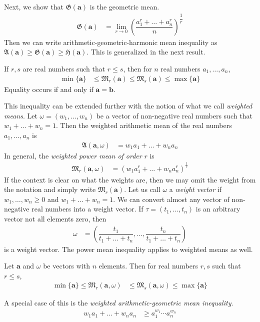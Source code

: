 \documentclass{subfile}
\begin{document}
	Next, we show that $\mathfrak{G}(\mathbf{a})$ is the geometric mean.
		\begin{align*}
			\mathfrak{G}(\mathbf{a})
				& = \lim\limits_{r\to0}\left(\dfrac{a_{1}^{r}+\ldots+a_{n}^{r}}{n}\right)^{\dfrac{1}{r}}
		\end{align*}
	Then we can write arithmetic-geometric-harmonic mean inequality as $\mathfrak{A}(\mathbf{a})\geq\mathfrak{G}(\mathbf{a})\geq \mathfrak{H}(\mathbf{a})$. This is generalized in the next result.
		\begin{theorem}
			If $r,s$ are real numbers such that $r\leq s$, then for $n$ real numbers $a_{1},\ldots,a_{n}$,
				\begin{align*}
					\min\{\mathbf{a}\}
						& \leq \mathfrak{M}_{r}(\mathbf{a})\leq \mathfrak{M}_{s}(\mathbf{a})\leq\max\{\mathbf{a}\}
				\end{align*}
			Equality occurs if and only if $\mathbf{a}=\mathbf{b}$.
		\end{theorem}
	This inequality can be extended further with the notion of what we call \textit{weighted means}. Let $\omega=(w_{1},\ldots,w_{n})$ be a vector of non-negative real numbers such that $w_{1}+\ldots+w_{n}=1$. Then the weighted arithmetic mean of the real numbers $a_{1},\ldots,a_{n}$ is
		\begin{align*}
			\mathfrak{A}(\mathbf{a},\omega)
				& = w_{1}a_{1}+\ldots+w_{n}a_{n}
		\end{align*}
	In general, the \textit{weighted power mean of order} $r$ is
		\begin{align*}
			\mathfrak{M}_{r}(\mathbf{a},\omega)
				& = \left(w_{1}a_{1}^{r}+\ldots+w_{n}a_{n}^{r}\right)^{\frac{1}{r}}
		\end{align*}
	If the context is clear on what the weights are, then we may omit the weight from the notation and simply write $\mathfrak{M}_{r}(\mathbf{a})$. Let us call $\omega$ a \textit{weight vector} if $w_{1},\ldots,w_{n}\geq 0$ and $w_{1}+\ldots+w_{n}=1$. We can convert almost any vector of non-negative real numbers into a weight vector. If $\tau=(t_{1},\ldots,t_{n})$ is an arbitrary vector not all elements zero, then
		\begin{align*}
			\omega
				& = \left(\dfrac{t_{1}}{t_{1}+\ldots+t_{n}},\ldots,\dfrac{t_{n}}{t_{1}+\ldots+t_{n}}\right)
		\end{align*}
	is a weight vector. The power mean inequality applies to weighted means as well.
		\begin{theorem}\label{thm:weightedpowermean}
			Let $\mathbf{a}$ and $\omega$ be vectors with $n$ elements. Then for real numbers $r,s$ such that $r\leq s$,
				\begin{align*}
					\min\{\mathbf{a}\} \leq \mathfrak{M}_{r}(\mathbf{a},\omega)
						& \leq \mathfrak{M}_{s}(\mathbf{a},\omega)\leq \max\{\mathbf{a}\}
				\end{align*}
		\end{theorem}
	A special case of this is the \textit{weighted arithmetic-geometric mean inequality}.
		\begin{align}
			w_{1}a_{1}+\ldots+w_{n}a_{n}
				& \geq a_{1}^{w_{1}}\cdots a_{n}^{w_{n}}\label{eqn:weightedamgm}
		\end{align}
\end{document}
